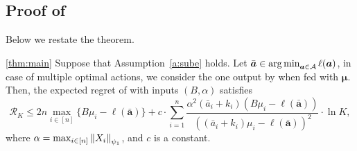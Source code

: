 \subsection{Proof of }
\label{proof:thm:main}

Below we restate the theorem.

\begin{restate-theorem}{\ref{thm:main}}
	Suppose that Assumption~\ref{a:sube} holds. Let $\bar{\bm{a}} \in \operatorname*{arg\,min}_{\bm{a} \in \mathcal{A}} \ell(\bm{a})$, in case of multiple optimal actions, we consider the one output by  when fed with $\bm{\mu}$.
	Then, the expected regret of  with inputs $(B, \alpha)$  satisfies
	$$
	\mathcal{R}_K
	\le 2n\max_{i \in [n]} \{B\mu_i -\ell(\bar{\bm{a}})\}+c \cdot\sum_{i=1}^{n} \frac{\alpha^2(\bar{a}_i+k_i)(B \mu_i - \ell(\bar{\bm{a}})) }{\left((\bar{a}_i+k_i)\mu_i - \ell(\bar{\bm{a}})\right)^2}\cdot \ln K,
	$$
	where $\alpha = \max_{i \in [n]} \left\| X_i \right\|_{\psi_1}$, and $c$ is a constant.
\end{restate-theorem}
%
